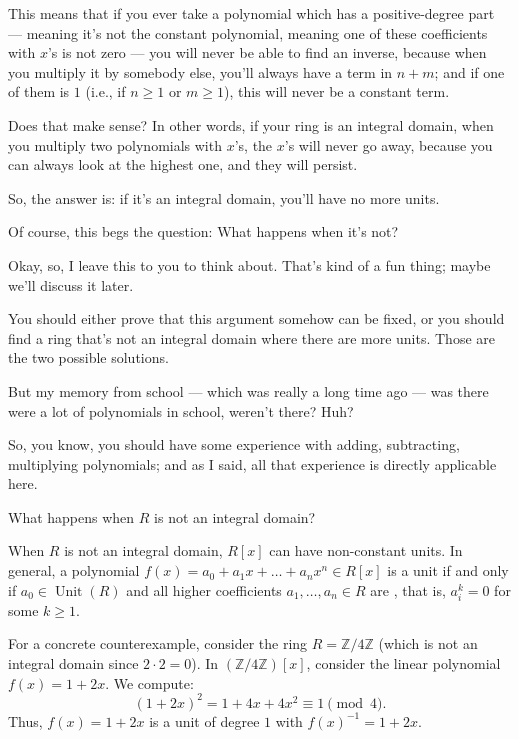 \begin{speech}[00:23:22 - 00:25:19]
This means that if you ever take a polynomial which has a positive-degree part --- meaning it's not the constant polynomial, meaning one of these coefficients with $x$'s is not zero --- you will never be able to find an inverse, because when you multiply it by somebody else, you'll always have a term in $n+m$; and if one of them is $1$ (i.e., if $n \ge 1$ or $m \ge 1$), this will never be a constant term.

Does that make sense? In other words, if your ring is an integral domain, when you multiply two polynomials with $x$'s, the $x$'s will never go away, because you can always look at the highest one, and they will persist.

So, the answer is: if it's an integral domain, you'll have no more units.

Of course, this begs the question: What happens when it's not? 

Okay, so, I leave this to you to think about. That's kind of a fun thing; maybe we'll discuss it later.

You should either prove that this argument somehow can be fixed, or you should find a ring that's not an integral domain where there are more units. Those are the two possible solutions.

But my memory from school --- which was really a long time ago --- was there were a lot of polynomials in school, weren't there? Huh?

So, you know, you should have some experience with adding, subtracting, multiplying polynomials; and as I said, all that experience is directly applicable here.
\end{speech}

\begin{content}
\begin{question}
What happens when $R$ is not an integral domain?
\end{question}
\end{content}

\begin{aiNote}
When $R$ is not an integral domain, $R[x]$ can have non-constant units. In general, a polynomial $f(x) = a_0 + a_1 x + \dots + a_n x^n \in R[x]$ is a unit if and only if $a_0 \in \operatorname{Unit}(R)$ and all higher coefficients $a_1, \dots, a_n \in R$ are , that is, $a_i^k = 0$ for some $k \ge 1$. 

For a concrete counterexample, consider the ring $R = \mathbb{Z}/4\mathbb{Z}$ (which is not an integral domain since $2 \cdot 2 = 0$). In $(\mathbb{Z}/4\mathbb{Z})[x]$, consider the linear polynomial $f(x) = 1 + 2x$. We compute:
\[
(1 + 2x)^2 = 1 + 4x + 4x^2 \equiv 1 \pmod 4.
\]
Thus, $f(x) = 1 + 2x$ is a unit of degree $1$ with $f(x)^{-1} = 1 + 2x$.
\end{aiNote}

